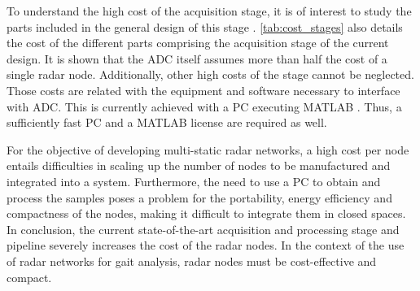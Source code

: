 To understand the high cost of the acquisition stage, it is of interest to study the parts included in the general design of this stage \cite{Sardinero2022}. \cref{tab:cost_stages} also details the cost of the different parts comprising the acquisition stage of the current design. It is shown that the ADC itself assumes more than half the cost of a single radar node. Additionally, other high costs of the stage cannot be neglected. Those costs are related with the equipment and software necessary to interface with ADC. This is currently achieved with a PC executing MATLAB \cite{Sardinero2022, Antolinos2020}. Thus, a sufficiently fast PC and a MATLAB license are required as well.

For the objective of developing multi-static radar networks, a high cost per node entails difficulties in scaling up the number of nodes to be manufactured and integrated into a system. Furthermore, the need to use a PC to obtain and process the samples poses a problem for the portability, energy efficiency and compactness of the nodes, making it difficult to integrate them in closed spaces.
In conclusion, the current state-of-the-art acquisition and processing stage and pipeline severely increases the cost of the radar nodes. In the context of the use of radar networks for gait analysis, radar nodes must be cost-effective and compact.